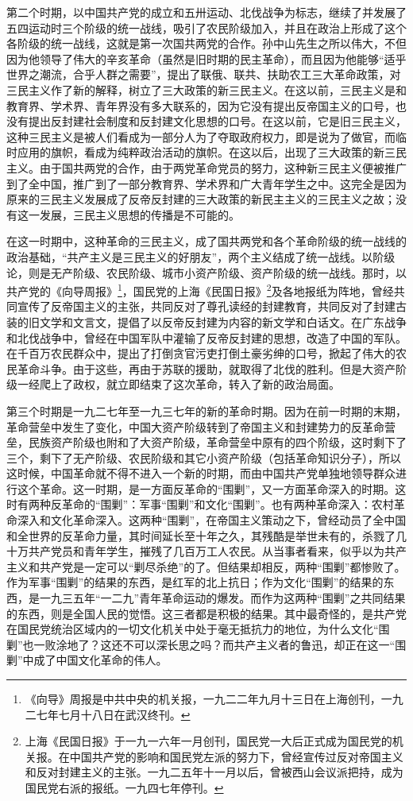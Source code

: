 \documentclass[UTF8, 12pt, a4paper]{ctexrep}
\begin{document}
第二个时期，以中国共产党的成立和五卅运动、北伐战争为标志，继续了并发展了五四运动时三个阶级的统一战线，吸引了农民阶级加入，并且在政治上形成了这个各阶级的统一战线，这就是第一次国共两党的合作。孙中山先生之所以伟大，不但因为他领导了伟大的辛亥革命（虽然是旧时期的民主革命），而且因为他能够“适乎世界之潮流，合乎人群之需要”，提出了联俄、联共、扶助农工三大革命政策，对三民主义作了新的解释，树立了三大政策的新三民主义。在这以前，三民主义是和教育界、学术界、青年界没有多大联系的，因为它没有提出反帝国主义的口号，也没有提出反封建社会制度和反封建文化思想的口号。在这以前，它是旧三民主义，这种三民主义是被人们看成为一部分人为了夺取政府权力，即是说为了做官，而临时应用的旗帜，看成为纯粹政治活动的旗帜。在这以后，出现了三大政策的新三民主义。由于国共两党的合作，由于两党革命党员的努力，这种新三民主义便被推广到了全中国，推广到了一部分教育界、学术界和广大青年学生之中。这完全是因为原来的三民主义发展成了反帝反封建的三大政策的新民主主义的三民主义之故；没有这一发展，三民主义思想的传播是不可能的。

在这一时期中，这种革命的三民主义，成了国共两党和各个革命阶级的统一战线的政治基础，“共产主义是三民主义的好朋友”，两个主义结成了统一战线。以阶级论，则是无产阶级、农民阶级、城市小资产阶级、资产阶级的统一战线。那时，以共产党的《向导周报》\footnote{《向导》周报是中共中央的机关报，一九二二年九月十三日在上海创刊，一九二七年七月十八日在武汉终刊。}，国民党的上海《民国日报》\footnote{上海《民国日报》于一九一六年一月创刊，国民党一大后正式成为国民党的机关报。在中国共产党的影响和国民党左派的努力下，曾经宣传过反对帝国主义和反对封建主义的主张。一九二五年十一月以后，曾被西山会议派把持，成为国民党右派的报纸。一九四七年停刊。}及各地报纸为阵地，曾经共同宣传了反帝国主义的主张，共同反对了尊孔读经的封建教育，共同反对了封建古装的旧文学和文言文，提倡了以反帝反封建为内容的新文学和白话文。在广东战争和北伐战争中，曾经在中国军队中灌输了反帝反封建的思想，改造了中国的军队。在千百万农民群众中，提出了打倒贪官污吏打倒土豪劣绅的口号，掀起了伟大的农民革命斗争。由于这些，再由于苏联的援助，就取得了北伐的胜利。但是大资产阶级一经爬上了政权，就立即结束了这次革命，转入了新的政治局面。

第三个时期是一九二七年至一九三七年的新的革命时期。因为在前一时期的末期，革命营垒中发生了变化，中国大资产阶级转到了帝国主义和封建势力的反革命营垒，民族资产阶级也附和了大资产阶级，革命营垒中原有的四个阶级，这时剩下了三个，剩下了无产阶级、农民阶级和其它小资产阶级（包括革命知识分子），所以这时候，中国革命就不得不进入一个新的时期，而由中国共产党单独地领导群众进行这个革命。这一时期，是一方面反革命的“围剿”，又一方面革命深入的时期。这时有两种反革命的“围剿”：军事“围剿”和文化“围剿”。也有两种革命深入：农村革命深入和文化革命深入。这两种“围剿”，在帝国主义策动之下，曾经动员了全中国和全世界的反革命力量，其时间延长至十年之久，其残酷是举世未有的，杀戮了几十万共产党员和青年学生，摧残了几百万工人农民。从当事者看来，似乎以为共产主义和共产党是一定可以“剿尽杀绝”的了。但结果却相反，两种“围剿”都惨败了。作为军事“围剿”的结果的东西，是红军的北上抗日；作为文化“围剿”的结果的东西，是一九三五年“一二九”青年革命运动的爆发。而作为这两种“围剿”之共同结果的东西，则是全国人民的觉悟。这三者都是积极的结果。其中最奇怪的，是共产党在国民党统治区域内的一切文化机关中处于毫无抵抗力的地位，为什么文化“围剿”也一败涂地了？这还不可以深长思之吗？而共产主义者的鲁迅，却正在这一“围剿”中成了中国文化革命的伟人。
\end{document}
